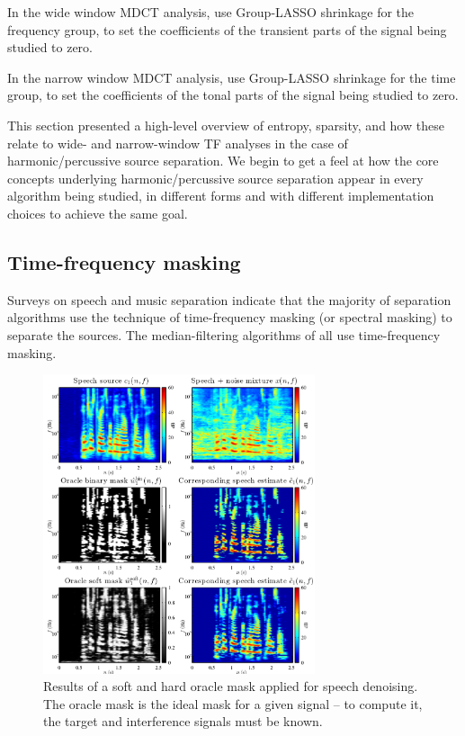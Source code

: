 \documentclass[letter,12pt]{article}
\newenvironment{tight_itemize}{
\begin{itemize}
  \setlength{\itemsep}{0pt}
  \setlength{\parskip}{0pt}
}{\end{itemize}}
\begin{document}
\begin{tight_itemize}
	\item
		In the wide window MDCT analysis, use Group-LASSO shrinkage for the frequency group, to set the coefficients of the transient parts of the signal being studied to zero.
	\item
		In the narrow window MDCT analysis, use Group-LASSO shrinkage for the time group, to set the coefficients of the tonal parts of the signal being studied to zero.
\end{tight_itemize}

This section presented a high-level overview of entropy, sparsity, and how these relate to wide- and narrow-window TF analyses in the case of harmonic/percussive source separation. We begin to get a feel at how the core concepts underlying harmonic/percussive source separation appear in every algorithm being studied, in different forms and with different implementation choices to achieve the same goal.

\vfill
\clearpage

\subsection{Time-frequency masking}

Surveys on speech \cite{speechmask} and music separation \cite{musicmask} indicate that the majority of separation algorithms use the technique of time-frequency masking (or spectral masking) to separate the sources. The median-filtering algorithms of \citet{fitzgerald1, fitzgerald2, driedger} all use time-frequency masking.

\begin{figure}
	\vspace{-1.0em}
	\includegraphics[width=8cm]{./maskdemo.png}
	\caption{Results of a soft and hard oracle mask applied for speech denoising. The oracle mask is the ideal mask for a given signal -- to compute it, the target and interference signals must be known.}
	\label{fig:masks}
	\vspace{-1.5em}
\end{figure}
\end{document}
